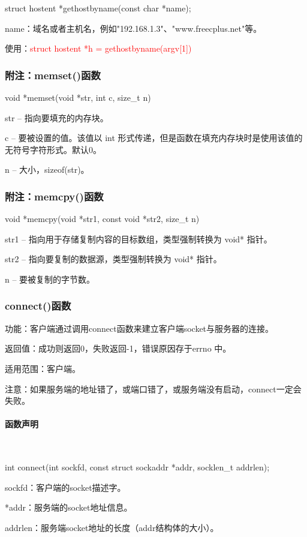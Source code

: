 \documentclass[UTF8]{article}%
\begin{document}
struct hostent *gethostbyname(const char *name);

name：域名或者主机名，例如"192.168.1.3"、"www.freecplus.net"等。

使用：\textcolor{red}{struct hostent *h = gethostbyname(argv[1])}

\subsubsection{附注：memset()函数}

void *memset(void *str, int c, size\_t n)

str -- 指向要填充的内存块。

c -- 要被设置的值。该值以 int 形式传递，但是函数在填充内存块时是使用该值的无符号字符形式。默认0。

n -- 大小，sizeof(str)。

\subsubsection{附注：memcpy()函数}

void *memcpy(void *str1, const void *str2, size\_t n)

str1 -- 指向用于存储复制内容的目标数组，类型强制转换为 void* 指针。

str2 -- 指向要复制的数据源，类型强制转换为 void* 指针。

n -- 要被复制的字节数。

\subsubsection{connect()函数}

功能：客户端通过调用connect函数来建立客户端socket与服务器的连接。

返回值：成功则返回0，失败返回-1，错误原因存于errno 中。

适用范围：客户端。

注意：如果服务端的地址错了，或端口错了，或服务端没有启动，connect一定会失败。

\paragraph{函数声明}~{}

int connect(int sockfd, const struct sockaddr *addr, socklen\_t addrlen);

sockfd：客户端的socket描述字。

*addr：服务端的socket地址信息。

addrlen：服务端socket地址的长度（addr结构体的大小）。
\end{document}
